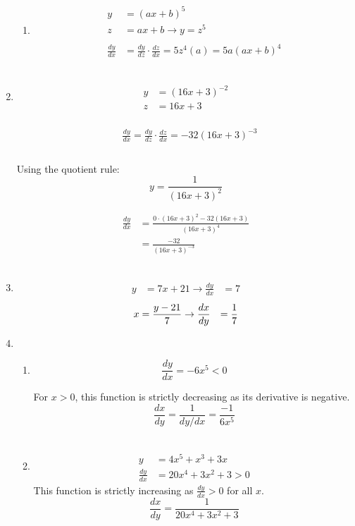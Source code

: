 \documentclass{./../../Latex/homework}
\begin{document}
\begin{enumerate}
\begin{enumerate}
\item
$$
 \begin{aligned}
y &=(a x+b)^{5} \\
z &=a x+b \rightarrow y=z^{5} \\~\\
\frac{d y}{d x} &=\frac{d y}{d z} \cdot \frac{d z}{d x}=5 z^{4}(a)=5 a(a x+b)^{4}
\end{aligned}
$$\\
\end{enumerate}

\item $$
\begin{aligned}
  y&=(16 x+3)^{-2} \\
z&=16 x+3
\end{aligned}
$$ \\
$$
\begin{aligned}
&\frac{d y}{d x}=\frac{d y}{d z} \cdot \frac{dz}{d x} =-32(16 x+3)^{-3} \\
\end{aligned}
$$
\\
Using the quotient rule:
$$y=\frac{1}{(16 x+3)^{2}}$$

$$
\begin{aligned}
\frac{d y}{d x} &=\frac{0 \cdot(16 x+3)^{2}-32(16 x+3)}{(16 x+3)^{4}} \\
&=\frac{-32}{(16 x+3)^{-3}}
\end{aligned}
$$ \\

\item $$\begin{aligned} y &=7x+21 \rightarrow \frac{d y}{d x} &=7 \end{aligned}$$
$$ \\
\begin{aligned}
 x &=\frac{y-21}{7} \rightarrow \frac{d x}{d y} &=\frac{1}{7}  \\
\end{aligned}
$$


\item 
\begin{enumerate} \item $$\frac{d y}{d x}=-6 x^{5}<0$$

For $x>0$, this function is strictly decreasing as its derivative is negative.
$$
\frac{d x}{d y}=\frac{1}{d y / d x}=\frac{-1}{6 x^{5}}
$$ \\

\item
$$
\begin{aligned}
y &=4 x^{5}+x^{3}+3 x \\
\frac{d y}{d x} &=20 x^{4}+3 x^{2}+3>0
\end{aligned}
$$
This function is strictly increasing as $\frac{d y}{d x}>0$ for all $x$.
$$
\frac{d x}{d y}=\frac{1}{20 x^{4}+3 x^{2}+3}
$$
\end{enumerate}
\end{enumerate}
\end{document}
